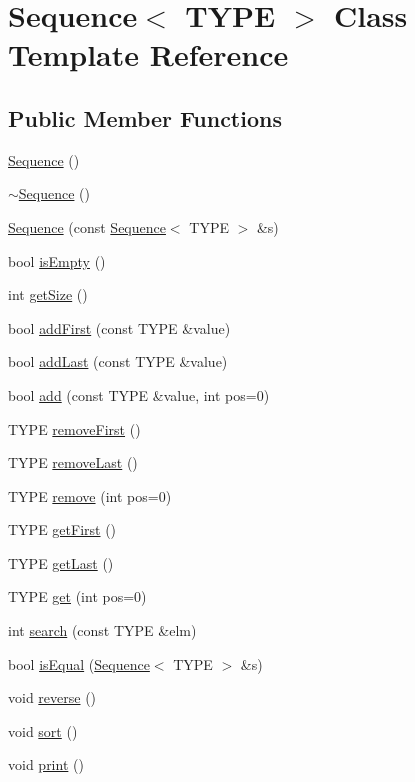 \hypertarget{class_sequence}{}\section{Sequence$<$ T\+Y\+P\+E $>$ Class Template Reference}
\label{class_sequence}
\subsection*{Public Member Functions}
\begin{DoxyCompactItemize}
\item 
\hyperlink{class_sequence_a69865d17cd69ba765a6cb034be7539b9}{Sequence} ()
\item 
\hyperlink{class_sequence_ace9aa11de35439018052db2efb8a7369}{$\sim$\+Sequence} ()
\item 
\hyperlink{class_sequence_a73d0aa763847bbaa3b2d4eca62abc8f7}{Sequence} (const \hyperlink{class_sequence}{Sequence}$<$ T\+Y\+P\+E $>$ \&s)
\item 
bool \hyperlink{class_sequence_a6418341e58be9f5d8303266521f5b4d3}{is\+Empty} ()
\item 
int \hyperlink{class_sequence_aa10151201b866f031d800519c94b1f60}{get\+Size} ()
\item 
bool \hyperlink{class_sequence_a4cc033f7279c21353908bc322985450d}{add\+First} (const T\+Y\+P\+E \&value)
\item 
bool \hyperlink{class_sequence_aba18baeedbc81a9b24c9331b4ee78881}{add\+Last} (const T\+Y\+P\+E \&value)
\item 
bool \hyperlink{class_sequence_a5c9bdbf02bea5ef4552c127f8bc40bda}{add} (const T\+Y\+P\+E \&value, int pos=0)
\item 
T\+Y\+P\+E \hyperlink{class_sequence_a6c2f27cca357a3f494e7f05209f11afc}{remove\+First} ()
\item 
T\+Y\+P\+E \hyperlink{class_sequence_a5325f9adedf34e7bbbae9a5241b167b0}{remove\+Last} ()
\item 
T\+Y\+P\+E \hyperlink{class_sequence_a041bb764297bfb85fe76a3fe21f80533}{remove} (int pos=0)
\item 
T\+Y\+P\+E \hyperlink{class_sequence_ac53c75e455dc23747148bbc14f808a91}{get\+First} ()
\item 
T\+Y\+P\+E \hyperlink{class_sequence_a25eacb0919853eab899ff5c687a0a26a}{get\+Last} ()
\item 
T\+Y\+P\+E \hyperlink{class_sequence_a08130d1d69774ffbe0f8942121604b12}{get} (int pos=0)
\item 
int \hyperlink{class_sequence_a52d217525d72abdca19e52c5f287734c}{search} (const T\+Y\+P\+E \&elm)
\item 
bool \hyperlink{class_sequence_ae9b4b08e48aa47199a1db42dd983c294}{is\+Equal} (\hyperlink{class_sequence}{Sequence}$<$ T\+Y\+P\+E $>$ \&s)
\item 
void \hyperlink{class_sequence_a377edb6182dd993d65d294f300033c19}{reverse} ()
\item 
void \hyperlink{class_sequence_a7c506a0479ef801d45871a81a1804e26}{sort} ()
\item 
void \hyperlink{class_sequence_aa60f1dca0a449df7bf830eab4a243742}{print} ()
\end{DoxyCompactItemize}
